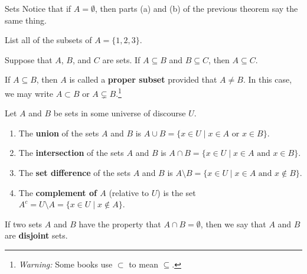 \begin{section}{Sets}
Notice that if $A=\emptyset$, then parts (a) and (b) of the previous theorem say the same thing.

\begin{problem}
List all of the subsets of $A=\{1,2,3\}$.  %
\end{problem}

\begin{theorem}
Suppose that $A$, $B$, and $C$ are sets.  If $A\subseteq B$ and $B\subseteq C$, then $A\subseteq C$.
\end{theorem}

\begin{definition}
If $A\subseteq B$, then $A$ is called a \textbf{proper subset} provided that $A\neq B$.  In this case, we may write $\boxed{A\subset B}$ or $\boxed{A\subsetneq B}$.\footnote{\emph{Warning:} Some books use $\subset$ to mean $\subseteq$.}
\end{definition}

\begin{definition}
Let $A$ and $B$ be sets in some universe of discourse $U$.
\begin{enumerate}[label=\textrm{(\alph*)}]
\item The \textbf{union} of the sets $A$ and $B$ is $\boxed{A \cup B =\{x\in U \mid x\in A \mbox{ or } x\in B \}}$.
\item The \textbf{intersection} of the sets $A$ and $B$ is $\boxed{A \cap B =\{x\in U \mid x\in A \mbox{ and } x\in B \}}$.
\item The \textbf{set difference} of the sets $A$ and $B$ is $\boxed{A \setminus B =\{x\in U \mid x\in A \mbox{ and } x\notin B \}}$.
\item The \textbf{complement of $A$} (relative to $U$) is the set $\boxed{A^c=U \setminus A =\{x \in U \mid x \notin A\}}$.
\end{enumerate}
\end{definition}

\begin{definition}
If two sets $A$ and $B$ have the property that $A \cap B = \emptyset$, then we say that $A$ and $B$ are \textbf{disjoint} sets.
\end{definition}


\end{section}
